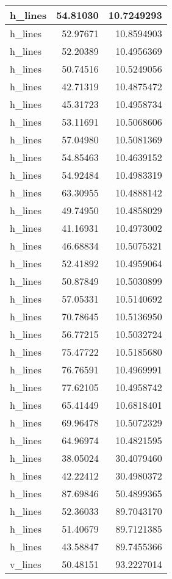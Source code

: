 \documentclass[
]{book}
\theoremstyle{definition}
\theoremstyle{definition}
\theoremstyle{definition}
\theoremstyle{definition}
\theoremstyle{remark}
\begin{document}
\begin{tabular}{l|r|r}
\hline
h\_lines & 54.81030 & 10.7249293\\
\hline
h\_lines & 52.97671 & 10.8594903\\
\hline
h\_lines & 52.20389 & 10.4956369\\
\hline
h\_lines & 50.74516 & 10.5249056\\
\hline
h\_lines & 42.71319 & 10.4875472\\
\hline
h\_lines & 45.31723 & 10.4958734\\
\hline
h\_lines & 53.11691 & 10.5068606\\
\hline
h\_lines & 57.04980 & 10.5081369\\
\hline
h\_lines & 54.85463 & 10.4639152\\
\hline
h\_lines & 54.92484 & 10.4983319\\
\hline
h\_lines & 63.30955 & 10.4888142\\
\hline
h\_lines & 49.74950 & 10.4858029\\
\hline
h\_lines & 41.16931 & 10.4973002\\
\hline
h\_lines & 46.68834 & 10.5075321\\
\hline
h\_lines & 52.41892 & 10.4959064\\
\hline
h\_lines & 50.87849 & 10.5030899\\
\hline
h\_lines & 57.05331 & 10.5140692\\
\hline
h\_lines & 70.78645 & 10.5136950\\
\hline
h\_lines & 56.77215 & 10.5032724\\
\hline
h\_lines & 75.47722 & 10.5185680\\
\hline
h\_lines & 76.76591 & 10.4969991\\
\hline
h\_lines & 77.62105 & 10.4958742\\
\hline
h\_lines & 65.41449 & 10.6818401\\
\hline
h\_lines & 69.96478 & 10.5072329\\
\hline
h\_lines & 64.96974 & 10.4821595\\
\hline
h\_lines & 38.05024 & 30.4079460\\
\hline
h\_lines & 42.22412 & 30.4980372\\
\hline
h\_lines & 87.69846 & 50.4899365\\
\hline
h\_lines & 52.36033 & 89.7043170\\
\hline
h\_lines & 51.40679 & 89.7121385\\
\hline
h\_lines & 43.58847 & 89.7455366\\
\hline
v\_lines & 50.48151 & 93.2227014\\

\end{tabular}
\end{document}
